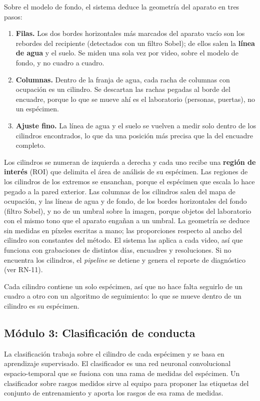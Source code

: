 Sobre el modelo de fondo, el sistema deduce la geometría del aparato en tres pasos:

\begin{enumerate}
  \item \textbf{Filas.} Los dos bordes horizontales más marcados del aparato vacío
        son los rebordes del recipiente (detectados con un filtro Sobel); de ellos salen la \textbf{línea de agua} y
        el suelo. Se miden una sola vez por video, sobre el modelo de fondo, y no
        cuadro a cuadro.
  \item \textbf{Columnas.} Dentro de la franja de agua, cada racha de columnas con
        ocupación es un cilindro. Se descartan las rachas pegadas al borde del
        encuadre, porque lo que se mueve ahí es el laboratorio (personas, puertas),
        no un espécimen.
  \item \textbf{Ajuste fino.} La línea de agua y el suelo se vuelven a medir solo
        dentro de los cilindros encontrados, lo que da una posición más precisa
        que la del encuadre completo.
\end{enumerate}

Los cilindros se numeran de izquierda a derecha y cada uno recibe una
\textbf{región de interés} (ROI) que delimita el área de análisis de su espécimen.
Las regiones de los cilindros de los extremos se ensanchan, porque el espécimen que
escala lo hace pegado a la pared exterior. Las columnas de los cilindros salen del mapa de ocupación, y las líneas de agua y de fondo, de los bordes horizontales del fondo (filtro Sobel), y no de un umbral sobre la imagen, porque objetos del laboratorio con el mismo tono que
el aparato engañan a un umbral. La geometría se deduce sin medidas en píxeles escritas a mano; las proporciones respecto al ancho del cilindro son constantes del método. El sistema las aplica a cada video, así que funciona con grabaciones de distintos días, encuadres
y resoluciones. Si no encuentra los cilindros, el \textit{pipeline} se detiene y genera el
reporte de diagnóstico (ver RN-11).

Cada cilindro contiene un solo espécimen, así que no hace falta seguirlo de un
cuadro a otro con un algoritmo de seguimiento: lo que se mueve dentro de un
cilindro es su espécimen.

\subsection{Módulo 3: Clasificación de conducta}

La clasificación trabaja sobre el cilindro de cada espécimen y se basa en
aprendizaje supervisado. El clasificador es una red neuronal convolucional
espacio-temporal que se fusiona con una rama de medidas del espécimen. Un
clasificador sobre rasgos medidos sirve al equipo para proponer las
etiquetas del conjunto de entrenamiento y aporta los rasgos de esa rama de medidas.

